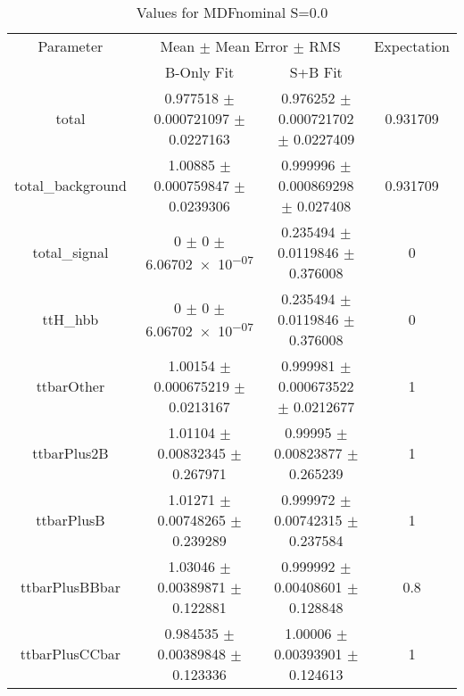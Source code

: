 \begin{table}
\centering
\caption{Values for MDFnominal S=0.0}
\begin{tabular}{cccc}
\toprule
Parameter & \multicolumn{2}{c}{Mean $\pm$ Mean Error $\pm$ RMS} & Expectation\\
 & B-Only Fit & S+B Fit & \\
\midrule
total & \num{0.977518} $\pm$ \num{0.000721097} $\pm$ \num{0.0227163} & \num{0.976252} $\pm$ \num{0.000721702} $\pm$ \num{0.0227409} & \num{0.931709}\\
total\_background & \num{1.00885} $\pm$ \num{0.000759847} $\pm$ \num{0.0239306} & \num{0.999996} $\pm$ \num{0.000869298} $\pm$ \num{0.027408} & \num{0.931709}\\
total\_signal & \num{0} $\pm$ \num{0} $\pm$ \num{6.06702e-07} & \num{0.235494} $\pm$ \num{0.0119846} $\pm$ \num{0.376008} & \num{0}\\
ttH\_hbb & \num{0} $\pm$ \num{0} $\pm$ \num{6.06702e-07} & \num{0.235494} $\pm$ \num{0.0119846} $\pm$ \num{0.376008} & \num{0}\\
ttbarOther & \num{1.00154} $\pm$ \num{0.000675219} $\pm$ \num{0.0213167} & \num{0.999981} $\pm$ \num{0.000673522} $\pm$ \num{0.0212677} & \num{1}\\
ttbarPlus2B & \num{1.01104} $\pm$ \num{0.00832345} $\pm$ \num{0.267971} & \num{0.99995} $\pm$ \num{0.00823877} $\pm$ \num{0.265239} & \num{1}\\
ttbarPlusB & \num{1.01271} $\pm$ \num{0.00748265} $\pm$ \num{0.239289} & \num{0.999972} $\pm$ \num{0.00742315} $\pm$ \num{0.237584} & \num{1}\\
ttbarPlusBBbar & \num{1.03046} $\pm$ \num{0.00389871} $\pm$ \num{0.122881} & \num{0.999992} $\pm$ \num{0.00408601} $\pm$ \num{0.128848} & \num{0.8}\\
ttbarPlusCCbar & \num{0.984535} $\pm$ \num{0.00389848} $\pm$ \num{0.123336} & \num{1.00006} $\pm$ \num{0.00393901} $\pm$ \num{0.124613} & \num{1}\\
\bottomrule
\end{tabular}
\end{table}
